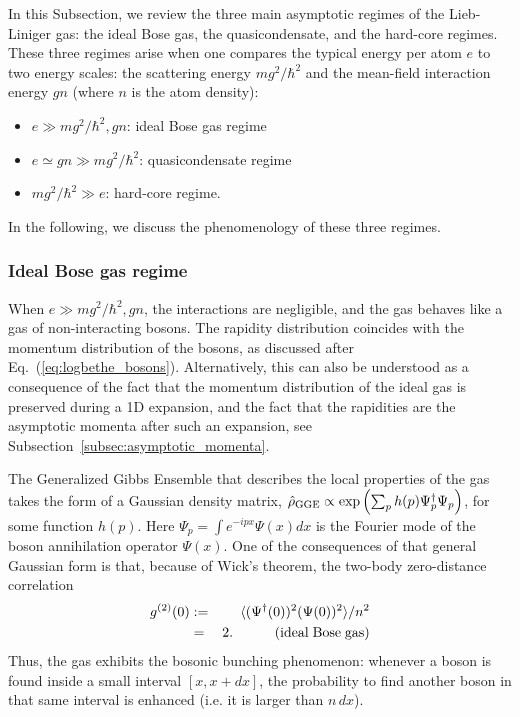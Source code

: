 \documentclass[onecolumn,amsfonts,showpacs,superscriptaddress]{revtex4-1}
\begin{document}
In this Subsection, we review the three main asymptotic regimes of the Lieb-Liniger gas: the ideal Bose gas, the quasicondensate, and the hard-core regimes. These three regimes arise when one compares the typical energy per atom $e$ to two energy scales: the scattering energy $mg^2/\hbar^2$ and the mean-field interaction energy $gn$ (where $n$ is the atom density):
\begin{itemize}
    \item $e \gg mg^2/\hbar^2 , g n$: ideal Bose gas regime
    \item $e \simeq g n   \gg  mg^2/\hbar^2 $: quasicondensate regime
    \item $mg^2/\hbar^2 \gg e$: hard-core regime.
\end{itemize}
In the following, we discuss the phenomenology of these three regimes.


\subsubsection{Ideal Bose gas regime}

When $e \gg mg^2/\hbar^2 , g n$, the interactions are negligible, and the gas behaves like a gas of non-interacting bosons. The rapidity distribution coincides with the momentum distribution of the bosons, as discussed after  Eq.~(\ref{eq:logbethe_bosons}). Alternatively, this can also be understood as a consequence of the fact that the momentum distribution of the ideal gas is preserved during a 1D expansion, and the fact that the rapidities are the asymptotic momenta after such an expansion, see Subsection~\ref{subsec:asymptotic_momenta}.

The Generalized Gibbs Ensemble that describes the local properties of the gas takes the form of a Gaussian density matrix, $\hat{\rho}_{\rm GGE} \propto \exp \left( \sum_{p} h(p) \Psi^\dagger_p \Psi_p \right)$, for some function $h(p)$.  Here $\Psi_p = \int e^{-ip x} \Psi(x) dx$ is the Fourier mode of the boson annihilation operator $\Psi(x)$. One of the consequences of that general Gaussian form is that, because of Wick's theorem, the two-body zero-distance correlation
\begin{eqnarray}
    \label{eq:g2_IBG}
 \nonumber   g^{(2)}(0) & := & \langle (\Psi^\dagger(0))^2  (\Psi(0))^2 \rangle/n^2 \\
    & = & 2. \qquad \quad ({\rm ideal \; Bose \; gas})
\end{eqnarray}
Thus, the gas exhibits the bosonic bunching phenomenon: whenever a boson is found inside a small interval $[x,x+d x]$, the probability to find another boson in that same interval is enhanced (i.e. it is larger than $n \,d x$).
\end{document}
